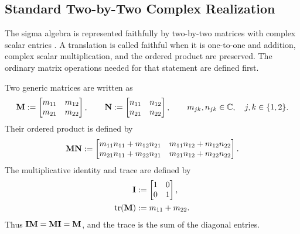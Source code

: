\subsection{Standard Two-by-Two Complex Realization}
\label{sec:matrix-realization}
The sigma algebra is represented faithfully by two-by-two matrices with
complex scalar entries \cite{pauli1927,hestenes1966,baylis1999}. A
translation is called faithful when it is one-to-one and addition, complex
scalar multiplication, and the ordered product are preserved. The ordinary
matrix operations needed for that statement are defined first.

Two generic matrices are written as
\begin{equation}
\mathbf{M}:=
\begin{bmatrix}
m_{11}&m_{12}\\
m_{21}&m_{22}
\end{bmatrix},
\qquad
\mathbf{N}:=
\begin{bmatrix}
n_{11}&n_{12}\\
n_{21}&n_{22}
\end{bmatrix},
\qquad
m_{jk},n_{jk}\in\mathbb{C},
\quad j,k\in\{1,2\}.
\label{eq:generic-two-by-two-matrices}
\end{equation}
Their ordered product is defined by
\begin{equation}
\mathbf{M}\mathbf{N}
:=
\begin{bmatrix}
m_{11}n_{11}+m_{12}n_{21}
&
m_{11}n_{12}+m_{12}n_{22}\\
m_{21}n_{11}+m_{22}n_{21}
&
m_{21}n_{12}+m_{22}n_{22}
\end{bmatrix}.
\label{eq:matrix-product}
\end{equation}
The multiplicative identity and trace are defined by
\begin{align}
\mathbf{I}
&:=
\begin{bmatrix}
1&0\\
0&1
\end{bmatrix},
\label{eq:matrix-identity}\\
\operatorname{tr}(\mathbf{M})
&:=m_{11}+m_{22}.
\label{eq:matrix-trace}
\end{align}
Thus \(\mathbf{I}\mathbf{M}=\mathbf{M}\mathbf{I}=\mathbf{M}\), and the trace is the sum of the
diagonal entries.

